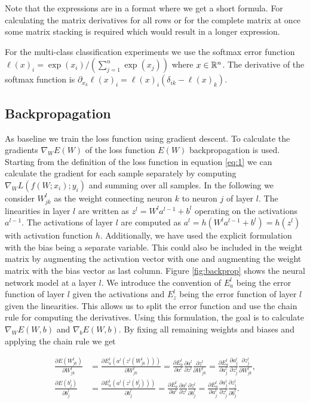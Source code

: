 \documentclass[english,11pt,a4paper]{article}
\begin{document}
Note that the expressions are in a format where we get a short formula. For calculating the matrix derivatives for all rows or for the complete matrix at once some matrix stacking is required which would result in a longer expression.

For the multi-class classification experiments we use the softmax error function $\ell(x)_i = \exp(x_i)/(\sum_{j=1}^{n} \exp(x_j))$ where $x \in \mathbb{R}^n$. The derivative of the softmax function is $\partial_{x_k} \ell(x)_i = \ell(x)_i (\delta_{ik} - \ell(x)_k)$.

\subsection{Backpropagation}

As baseline we train the loss function using gradient descent. To calculate the gradients $\nabla_{W}E(W)$ of the loss function $E(W)$ backpropagation is used. Starting from the definition of the loss function in equation \ref{eq:1} we can calculate the gradient for each sample separately by computing $\nabla_{W}L(f(W;x_i);y_i)$ and summing over all samples. In the following we consider $W_{jk}^l$ as the weight connecting neuron $k$ to neuron $j$ of layer $l$. The linearities in layer $l$ are written as $z^l = W^la^{l-1} + b^l$ operating on the activations $a^{l-1}$. The activations of layer $l$ are computed as $a^l = h(W^l a^{l-1} + b^l) = h(z^l)$ with activation function $h$. Additionally, we have used the explicit formulation with the bias being a separate variable. This could also be included in the weight matrix by augmenting the activation vector with one and augmenting the weight matrix with the bias vector as last column. Figure \ref{fig:backprop} shows the neural network model at a layer $l$. We introduce the convention of $E^l_a$ being the error function of layer $l$ given the activations and $E^l_z$ being the error function of layer $l$ given the linearities. This allows us to split the error function and use the chain rule for computing the derivatives. Using this formulation, the goal is to calculate $\nabla_{W}E(W,b)$ and $\nabla_{b}E(W,b)$. By fixing all remaining weights and biases and applying the chain rule we get

\begin{equation}
	\begin{aligned}
		\frac{\partial E(W_{jk}^l)}{\partial W_{jk}^l} &= 
		\frac{\partial E^l_a(a^l(z^l(W_{jk}^l)))}{\partial W_{jk}^l} =
		\frac{\partial E^l_a}{\partial a^l} \frac{\partial a^l}{\partial z^l} \frac{\partial z^l}{\partial W^l_{jk}} =
		\frac{\partial E^l_a}{\partial a^l_j} \frac{\partial a^l_j}{\partial z^l_j} \frac{\partial z^l_j}{\partial W^l_{jk}}, \\
		\frac{\partial E(b_j^l)}{\partial b_j^l} &=
		\frac{\partial E^l_a(a^l(z^l(b_j^l)))}{\partial b_j^l} =
		\frac{\partial E^l_a}{\partial a^l} \frac{\partial a^l}{\partial z^l} \frac{\partial z^l}{\partial b_j^l} =
		\frac{\partial E^l_a}{\partial a^l_j} \frac{\partial a^l_j}{\partial z^l_j} \frac{\partial z^l_j}{\partial b_j^l}.
	\end{aligned}
	\label{eq:backprop_chainrule}
\end{equation}
\end{document}
